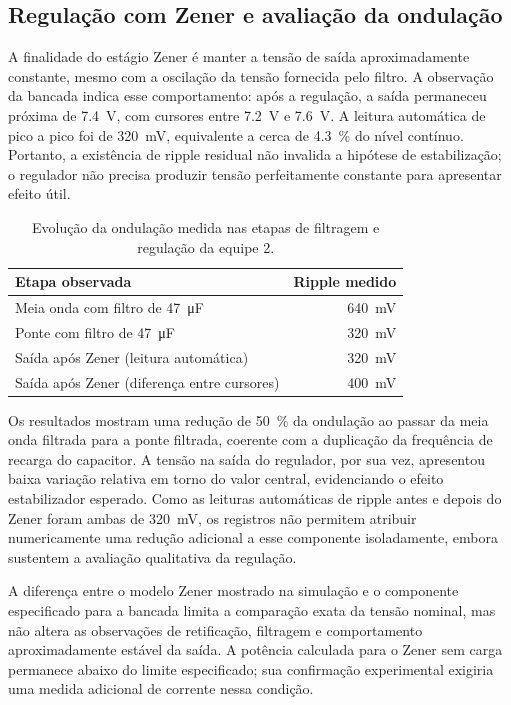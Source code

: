 \documentclass[11pt,a4paper]{article}
\begin{document}
\subsection{Regulação com Zener e avaliação da ondulação}

A finalidade do estágio Zener é manter a tensão de saída aproximadamente constante, mesmo com a oscilação da tensão fornecida pelo filtro. A observação da bancada indica esse comportamento: após a regulação, a saída permaneceu próxima de \SI{7,4}{\volt}, com cursores entre \SI{7,2}{\volt} e \SI{7,6}{\volt}. A leitura automática de pico a pico foi de \SI{320}{\milli\volt}, equivalente a cerca de \SI{4,3}{\percent} do nível contínuo. Portanto, a existência de ripple residual não invalida a hipótese de estabilização; o regulador não precisa produzir tensão perfeitamente constante para apresentar efeito útil.

\begin{table}[H]
\centering
\small
\caption{Evolução da ondulação medida nas etapas de filtragem e regulação da equipe 2.}
\label{tab:discussao_evolucao_ripple}
\begin{tabular}{@{}p{8.1cm}r@{}}
\toprule
\textbf{Etapa observada} & \textbf{Ripple medido} \\
\midrule
Meia onda com filtro de \SI{47}{\micro\farad} & \SI{640}{\milli\volt} \\
Ponte com filtro de \SI{47}{\micro\farad} & \SI{320}{\milli\volt} \\
Saída após Zener (leitura automática) & \SI{320}{\milli\volt} \\
Saída após Zener (diferença entre cursores) & \SI{400}{\milli\volt} \\
\bottomrule
\end{tabular}
\end{table}

Os resultados mostram uma redução de \SI{50}{\percent} da ondulação ao passar da meia onda filtrada para a ponte filtrada, coerente com a duplicação da frequência de recarga do capacitor. A tensão na saída do regulador, por sua vez, apresentou baixa variação relativa em torno do valor central, evidenciando o efeito estabilizador esperado. Como as leituras automáticas de ripple antes e depois do Zener foram ambas de \SI{320}{\milli\volt}, os registros não permitem atribuir numericamente uma redução adicional a esse componente isoladamente, embora sustentem a avaliação qualitativa da regulação.

A diferença entre o modelo Zener mostrado na simulação e o componente especificado para a bancada limita a comparação exata da tensão nominal, mas não altera as observações de retificação, filtragem e comportamento aproximadamente estável da saída. A potência calculada para o Zener sem carga permanece abaixo do limite especificado; sua confirmação experimental exigiria uma medida adicional de corrente nessa condição.
\end{document}
